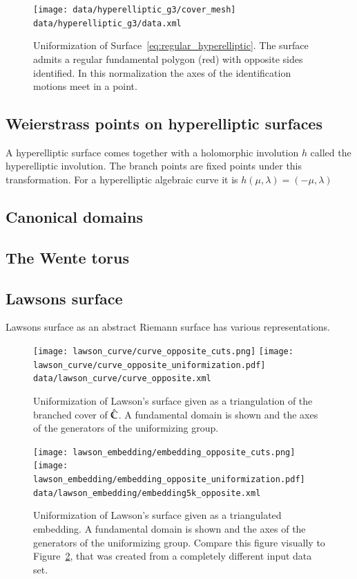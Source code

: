 \documentclass[Thesis.tex]{subfiles}
\begin{document}
\begin{figure} \centering
\texttt{[image: data/hyperelliptic\_g3/cover\_mesh]}
{\scriptsize\tt data/hyperelliptic\_g3/data.xml} 
\caption{Uniformization of Surface~\ref{eq:regular_hyperelliptic}. The surface
admits a regular fundamental polygon (red) with opposite sides identified. In
this normalization the axes of the identification motions meet in a point.}
\label{fig:regular_cover} 
\end{figure}


\subsection{Weierstrass points on hyperelliptic surfaces}
A hyperelliptic surface comes together with a holomorphic involution $h$
called the hyperelliptic involution. The branch points are fixed points under
this transformation. For a hyperelliptic algebraic curve it is $h(\mu,
\lambda)=(-\mu, \lambda)$

\subsection{Canonical domains}
\subsection{The Wente torus}
\subsection{Lawsons surface}

Lawsons surface as an abstract Riemann surface has various representations. 

\begin{figure}
\centering
\texttt{[image: lawson\_curve/curve\_opposite\_cuts.png]}
\texttt{[image: lawson\_curve/curve\_opposite\_uniformization.pdf]}
{\scriptsize\tt data/lawson\_curve/curve\_opposite.xml}
\caption{Uniformization of Lawson's surface given as a triangulation of the
branched cover of $\hat{\mathbb C}$. A fundamental domain is shown and the axes of the
generators of the uniformizing group.} 
\label{fig:lawson_curve_opposite}
\end{figure}


\begin{figure}
\centering
\texttt{[image: lawson\_embedding/embedding\_opposite\_cuts.png]}
\texttt{[image: lawson\_embedding/embedding\_opposite\_uniformization.pdf]}
{\scriptsize\tt data/lawson\_embedding/embedding5k\_opposite.xml}
\caption{Uniformization of Lawson's surface given as a triangulated embedding.
A fundamental domain is shown and the axes of the generators of the
uniformizing group. Compare this figure visually to
Figure~\ref{fig:lawson_curve_opposite}, that was created from a completely
different input data set.} 
\label{fig:lawson_embedding_opposite}
\end{figure}
\end{document}

